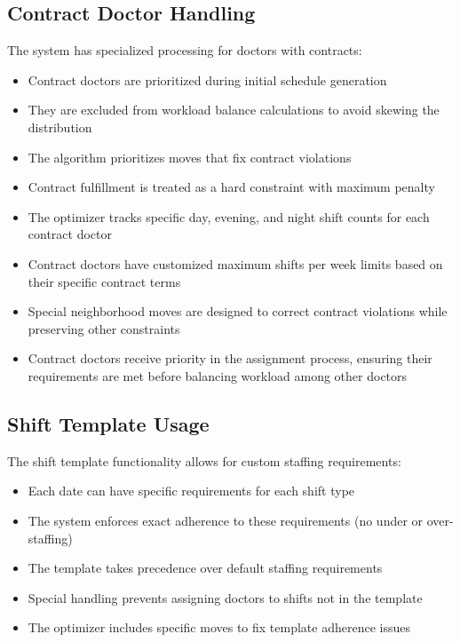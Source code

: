 \documentclass[12pt]{article}
\begin{document}
\subsection{Contract Doctor Handling}

The system has specialized processing for doctors with contracts:
\begin{itemize}
    \item Contract doctors are prioritized during initial schedule generation
    \item They are excluded from workload balance calculations to avoid skewing the distribution
    \item The algorithm prioritizes moves that fix contract violations
    \item Contract fulfillment is treated as a hard constraint with maximum penalty
    \item The optimizer tracks specific day, evening, and night shift counts for each contract doctor
    \item Contract doctors have customized maximum shifts per week limits based on their specific contract terms
    \item Special neighborhood moves are designed to correct contract violations while preserving other constraints
    \item Contract doctors receive priority in the assignment process, ensuring their requirements are met before balancing workload among other doctors
\end{itemize}

\subsection{Shift Template Usage}

The shift template functionality allows for custom staffing requirements:
\begin{itemize}
    \item Each date can have specific requirements for each shift type
    \item The system enforces exact adherence to these requirements (no under or over-staffing)
    \item The template takes precedence over default staffing requirements
    \item Special handling prevents assigning doctors to shifts not in the template
    \item The optimizer includes specific moves to fix template adherence issues
\end{itemize}
\end{document}
